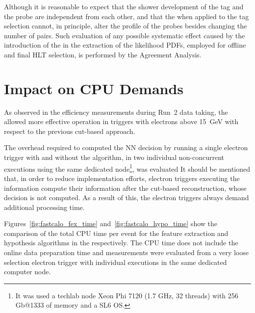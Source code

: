 Although it is reasonable to expect that the shower development of the tag and
the probe are independent from each other, and that the \rnn{} when applied to
the tag selection cannot, in principle, alter the profile of the probes besides
changing the number of \tnp{} pairs. Such evaluation of any possible systematic effect caused by the introduction of the \rnn{} in the extraction of the likelihood PDFs, employed for offline and final HLT selection, is performed by the Agreement Analysis.

\FloatBarrier
\section{Impact on CPU Demands} %

As observed in the efficiency measurements during Run~2 data taking, the \rnn{} allowed more effective \fastcalo{} operation in triggers with electrons above \SI{15}{\GeV}  with respect to the previous cut-based approach. 






The overhead required to computed the NN decision by running a single electron trigger with and without the \rnn algorithm, in two individual non-concurrent executions using the same dedicated node\footnote{It was used a techlab node Xeon Phi 7120 (1.7 GHz, 32 threads) with 256 Gb@1333 of memory and a SL6 OS.}, was evaluated
It should be mentioned that, in order to reduce implementation efforts, electron triggers executing the \rnn{} information compute their information after the cut-based reconstruction, whose decision is not computed. As a result of this, the \rnn{} electron 
triggers always demand additional \fastcalo processing time.

Figures~\ref{fig:fastcalo_fex_time} and~\ref{fig:fastcalo_hypo_time} show the comparison of the total CPU time per event for the feature extraction and hypothesis algorithms in the \fastcalo respectively.
The CPU time does not include the online data preparation time and measurements were evaluated from a very loose selection electron trigger with individual executions in the same dedicated computer node.


